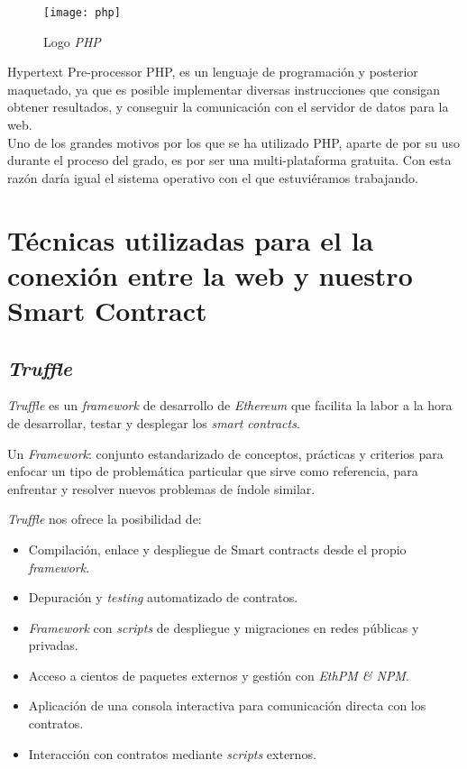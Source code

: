 \begin{wrapfigure}{r}{0.4\linewidth}
    \centering
    \texttt{[image: php]}
    \caption{Logo \textit{PHP}}
\end{wrapfigure}

Hypertext Pre-processor PHP\cite{php}, es un lenguaje de programación y posterior maquetado, ya que es posible implementar diversas instrucciones que consigan obtener resultados, y conseguir la comunicación con el servidor de datos para la web.\\

Uno de los grandes motivos por los que se ha utilizado PHP, aparte de por su uso durante el proceso del grado, es por ser una multi-plataforma gratuita. Con esta razón daría igual el sistema operativo con el que estuviéramos trabajando.



\section{Técnicas utilizadas para el la conexión entre la web y nuestro Smart Contract}

\subsection{\textit{Truffle}}

\textit{Truffle}\cite{truffle} es un \textit{framework} de desarrollo de \textit{Ethereum} que facilita la labor a la hora de desarrollar, testar y desplegar los \textit{smart contracts}.

Un \textit{Framework}:  conjunto estandarizado de conceptos, prácticas y criterios para enfocar un tipo de problemática particular que sirve como referencia, para enfrentar y resolver nuevos problemas de índole similar.

\textit{Truffle} nos ofrece la posibilidad de:

\begin{itemize}
	\item Compilación, enlace y despliegue de Smart contracts desde el propio \textit{framework}.
	\item Depuración y \textit{testing} automatizado de contratos.
	\item \textit{Framework} con \textit{scripts} de despliegue y migraciones en redes públicas y privadas.
	\item Acceso a cientos de paquetes externos y gestión con \textit{EthPM \& NPM}.
	\item Aplicación de una consola interactiva para comunicación directa con los contratos.
	\item Interacción con contratos mediante \textit{scripts} externos.
\end{itemize}
 

